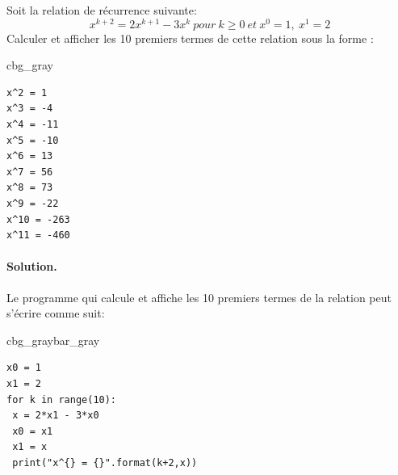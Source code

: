 \documentclass[%
oneside,                 %
final,                   %
10pt,french]{article}
\newenvironment{_cod_tight}[1]{
   \def\FrameCommand{\colorbox{#1}}
   \FrameRule0.6pt\MakeFramed {\FrameRestore}\vskip3mm}
   {\vskip0mm\endMakeFramed}
\newenvironment{cod}[1]{
\bgroup\rmfamily
\fboxsep=0mm\relax
\begin{_cod_tight}{#1}
\list{}{\parsep=-2mm\parskip=0mm\topsep=0pt\leftmargin=2mm
\rightmargin=2\leftmargin\leftmargin=4pt\relax}
\item\relax}
{\endlist\end{_cod_tight}\egroup}
\newenvironment{_pro_tight}[2]{
   \def\FrameCommand{\color{#2}\vrule width 1mm\normalcolor\colorbox{#1}}
   \FrameRule0.6pt\MakeFramed {\advance\hsize-2mm\FrameRestore}\vskip3mm}
   {\vskip0mm\endMakeFramed}
\newenvironment{pro}[2]{
\bgroup\rmfamily
\fboxsep=0mm\relax
\begin{_pro_tight}{#1}{#2}
\list{}{\parsep=-2mm\parskip=0mm\topsep=0pt\leftmargin=2mm
\rightmargin=2\leftmargin\leftmargin=4pt\relax}
\item\relax}
{\endlist\end{_pro_tight}\egroup}
\newenvironment{doconceexercise}{}{}
\newcounter{doconceexercisecounter}
\begin{document}
\begin{doconceexercise}



Soit la relation de récurrence suivante:
$$x^{k+2} = 2x^{k+1} - 3x^{k} \ pour \ k \ge 0 \ et \ x^0 =1, \  x^1 =2$$
Calculer et afficher les 10 premiers termes de cette relation sous la forme :
\begin{cod}{cbg_gray}\begin{verbatim}
x^2 = 1
x^3 = -4
x^4 = -11
x^5 = -10
x^6 = 13
x^7 = 56
x^8 = 73
x^9 = -22
x^10 = -263
x^11 = -460
\end{verbatim}
\end{cod}
\noindent


\paragraph{Solution.}
Le programme qui calcule et affiche les 10 premiers termes de la relation peut s’écrire comme suit:
\begin{pro}{cbg_gray}{bar_gray}\begin{verbatim}
x0 = 1
x1 = 2
for k in range(10):
 x = 2*x1 - 3*x0
 x0 = x1
 x1 = x
 print("x^{} = {}".format(k+2,x))
\end{verbatim}
\end{pro}
\noindent


\end{doconceexercise}


\end{document}
